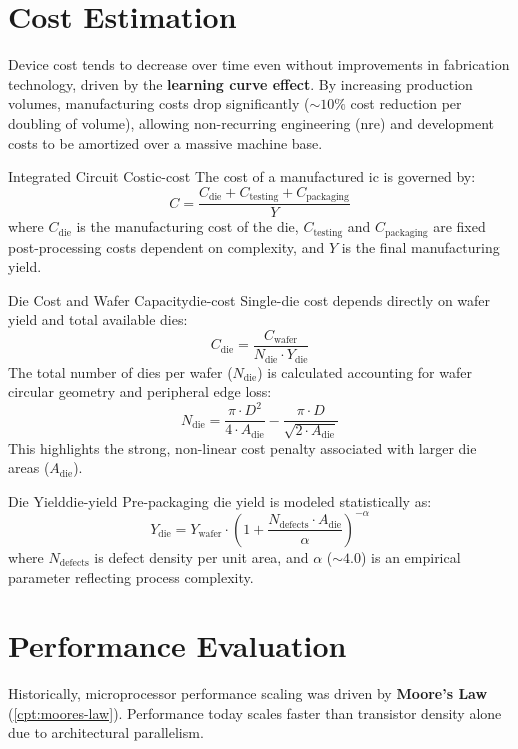\section{Cost Estimation}
Device cost tends to decrease over time even without improvements in fabrication technology, driven by the \textbf{learning curve effect}. By increasing production volumes, manufacturing costs drop significantly ($\sim 10\%$ cost reduction per doubling of volume), allowing non-recurring engineering (\gls{nre}) and development costs to be amortized over a massive machine base.

\begin{definition}{Integrated Circuit Cost}{ic-cost}
    The cost of a manufactured \gls{ic} is governed by:
    \[
        C = \frac{C_{\text{die}} + C_{\text{testing}} + C_{\text{packaging}}}{Y}
    \]
    where \(C_{\text{die}}\) is the manufacturing cost of the die, \(C_{\text{testing}}\) and \(C_{\text{packaging}}\) are fixed post-processing costs dependent on complexity, and \(Y\) is the final manufacturing yield.
\end{definition}

\begin{definition}{Die Cost and Wafer Capacity}{die-cost}
    Single-die cost depends directly on wafer yield and total available dies:
    \[
        C_{\text{die}} = \frac{C_{\text{wafer}}}{N_{\text{die}} \cdot Y_{\text{die}}}
    \]
    The total number of dies per wafer (\(N_{\text{die}}\)) is calculated accounting for wafer circular geometry and peripheral edge loss:
    \[
        N_{\text{die}} = \frac{\pi \cdot D^2}{4 \cdot A_{\text{die}}} - \frac{\pi \cdot D}{\sqrt{2 \cdot A_{\text{die}}}}
    \]
    This highlights the strong, non-linear cost penalty associated with larger die areas (\(A_{\text{die}}\)).
\end{definition}

\begin{definition}{Die Yield}{die-yield}
    Pre-packaging die yield is modeled statistically as:
    \[
        Y_{\text{die}} = Y_{\text{wafer}} \cdot \left(1 + \frac{N_{\text{defects}} \cdot A_{\text{die}}}{\alpha}\right)^{-\alpha}
    \]
    where \(N_{\text{defects}}\) is defect density per unit area, and \(\alpha\) ($\sim 4.0$) is an empirical parameter reflecting process complexity.
\end{definition}

\section{Performance Evaluation}
Historically, microprocessor performance scaling was driven by \textbf{Moore's Law} (\cref{cpt:moores-law}). Performance today scales faster than transistor density alone due to architectural parallelism.

